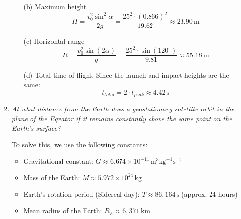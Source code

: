 \documentclass[a4paper,12pt]{letter}
\begin{document}
\begin{enumerate}
\begin{enumerate}
\item[(b)] Maximum height
\begin{equation}
    H = \frac{v_0^2 \sin^2\alpha}{2g} = \frac{25^2 \cdot (0.866)^2}{19.62} \approx 23.90\,\text{m}
\end{equation}

\item[(c)] Horizontal range
\begin{equation}
    R = \frac{v_0^2 \sin(2\alpha)}{g} = \frac{25^2 \cdot \sin(120^\circ)}{9.81} \approx 55.18\,\text{m}
\end{equation}

\item[(d)] Total time of flight. Since the launch and impact heights are the same:
\begin{equation}
    t_{total} = 2 \cdot t_{peak} \approx 4.42\,\text{s}
\end{equation}
\end{enumerate}

\begin{center}
\end{center}


\item \textit{At what distance from the Earth does a geostationary satellite orbit in the plane of the Equator if it remains constantly above the same point on the Earth's surface?}

\medskip

To solve this, we use the following constants:
\begin{itemize}
    \item Gravitational constant: $G \approx 6.674 \times 10^{-11} \, \text{m}^3\text{kg}^{-1}\text{s}^{-2}$
    \item Mass of the Earth: $M \approx 5.972 \times 10^{24} \, \text{kg}$
    \item Earth's rotation period (Sidereal day): $T \approx 86,164 \, \text{s}$ (approx. 24 hours)
    \item Mean radius of the Earth: $R_E \approx 6,371 \, \text{km}$
\end{itemize}


\end{enumerate}
\end{document}
